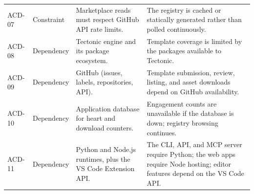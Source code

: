 \begin{xltabular}{\textwidth}{@{}p{0.13\textwidth}p{0.18\textwidth}X X@{}}
ACD-07 & Constraint & Marketplace reads must respect GitHub API rate limits. & The registry is cached or statically generated rather than polled continuously. \\
ACD-08 & Dependency & Tectonic engine and its package ecosystem. & Template coverage is limited by the packages available to Tectonic. \\
ACD-09 & Dependency & GitHub (issues, labels, repositories, API). & Template submission, review, listing, and asset downloads depend on GitHub availability. \\
ACD-10 & Dependency & Application database for heart and download counters. & Engagement counts are unavailable if the database is down; registry browsing continues. \\
ACD-11 & Dependency & Python and Node.js runtimes, plus the VS Code Extension API. & The CLI, API, and MCP server require Python; the web apps require Node hosting; editor features depend on the VS Code API. \\
\end{xltabular}


